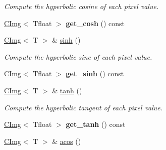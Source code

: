 \begin{DoxyCompactItemize}
\begin{DoxyCompactList}\small\item\em Compute the hyperbolic cosine of each pixel value. \item\end{DoxyCompactList}\item 
\hypertarget{structcimg__library_1_1CImg_a6c228835c1b900ba36f484c0113eccad}{
\hyperlink{structcimg__library_1_1CImg}{CImg}$<$ Tfloat $>$ {\bfseries get\_\-cosh} () const }
\label{structcimg__library_1_1CImg_a6c228835c1b900ba36f484c0113eccad}

\item 
\hypertarget{structcimg__library_1_1CImg_a1a6ea827550f0d28062fc028a764b119}{
\hyperlink{structcimg__library_1_1CImg}{CImg}$<$ T $>$ \& \hyperlink{structcimg__library_1_1CImg_a1a6ea827550f0d28062fc028a764b119}{sinh} ()}
\label{structcimg__library_1_1CImg_a1a6ea827550f0d28062fc028a764b119}

\begin{DoxyCompactList}\small\item\em Compute the hyperbolic sine of each pixel value. \item\end{DoxyCompactList}\item 
\hypertarget{structcimg__library_1_1CImg_a97d3744c3281fb1732726503fe82fb2f}{
\hyperlink{structcimg__library_1_1CImg}{CImg}$<$ Tfloat $>$ {\bfseries get\_\-sinh} () const }
\label{structcimg__library_1_1CImg_a97d3744c3281fb1732726503fe82fb2f}

\item 
\hypertarget{structcimg__library_1_1CImg_a52308dc94ca98f9a20d9bce54ea066ac}{
\hyperlink{structcimg__library_1_1CImg}{CImg}$<$ T $>$ \& \hyperlink{structcimg__library_1_1CImg_a52308dc94ca98f9a20d9bce54ea066ac}{tanh} ()}
\label{structcimg__library_1_1CImg_a52308dc94ca98f9a20d9bce54ea066ac}

\begin{DoxyCompactList}\small\item\em Compute the hyperbolic tangent of each pixel value. \item\end{DoxyCompactList}\item 
\hypertarget{structcimg__library_1_1CImg_a4d9221edbb585105165103ec1a6439c2}{
\hyperlink{structcimg__library_1_1CImg}{CImg}$<$ Tfloat $>$ {\bfseries get\_\-tanh} () const }
\label{structcimg__library_1_1CImg_a4d9221edbb585105165103ec1a6439c2}

\item 
\hypertarget{structcimg__library_1_1CImg_aec748ded5bb19d52f564ef7a6ae2652d}{
\hyperlink{structcimg__library_1_1CImg}{CImg}$<$ T $>$ \& \hyperlink{structcimg__library_1_1CImg_aec748ded5bb19d52f564ef7a6ae2652d}{acos} ()}
\label{structcimg__library_1_1CImg_aec748ded5bb19d52f564ef7a6ae2652d}


\end{DoxyCompactItemize}

